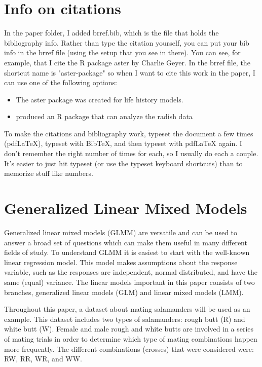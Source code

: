 \documentclass{article}
\begin{document}
\section{Info on citations}
In the paper folder, I added brref.bib, which is the file that holds the bibliography info. Rather than  type the citation yourself, you can put your bib info in the brref file (using the setup that you see in there). You can see, for example, that I cite the R package aster by Charlie Geyer. In the brref file, the shortcut name is "aster-package" so when I want to cite this work in the paper, I can use one of the following options:
\begin{itemize}
\item The aster package \citep{aster-package} was created for life history models.
\item  \citet{aster-package} produced an R package that can analyze the radish data 
\end{itemize}

To make the citations and bibliography work, typeset the document a few times (pdfLaTeX), typeset with BibTeX, and then typeset with pdfLaTeX again. I don't remember the right number of times for each, so I usually do each a couple. It's easier to just hit typeset (or use the typeset keyboard shortcuts) than to memorize stuff like numbers. 

\section{Generalized Linear Mixed Models}
Generalized linear mixed models (GLMM) are versatile and can be used to answer a broad set of questions which can make them useful in many different fields of study.  To understand GLMM it is easiest to start with the well-known linear regression model.  This model makes assumptions about the response variable, such as the responses are independent, normal distributed, and have the same (equal) variance.  The linear models important in this paper consists of two branches, generalized linear models (GLM) and linear mixed models (LMM). 

Throughout this paper, a dataset about mating salamanders will be used as an example.  This dataset includes two types of salamanders: rough butt (R) and white butt (W).  Female and male rough and white butts are involved in a series of mating trials in order to determine which type of mating combinations happen more frequently.  The different combinations (crosses) that were considered were: RW, RR, WR, and WW.
	
\end{document}

